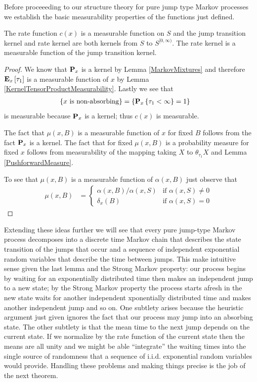 Before proceeeding to our structure theory for pure jump type Markov
processes we establish the basic measurability properties of the
functions just defined.
\begin{lem}\label{MeasurabilityRateKernel}The rate function $c(x)$ is a measurable function on $S$
  and the jump transition kernel and rate kernel are both kernels from
  $S$ to $S^{[0,\infty)}$.  The rate kernel is a measurable function
  of the jump transition kernel.
\end{lem}
\begin{proof}
We know that $\probabilityop_x$ is a kernel by Lemma
\ref{MarkovMixtures} and therefore $\sexpectation{\tau_1}{x}$ is a
measurable function of $x$ by Lemma
\ref{KernelTensorProductMeasurability}.  Lastly we see that 
\begin{align*}
\lbrace x \text{ is non-absorbing} \rbrace &= \lbrace \sprobability{\tau_1 <
  \infty}{x} = 1 \rbrace
\end{align*}
is measurable because $\probabilityop_x$ is a kernel; thus $c(x)$ is measurable.

The fact that $\mu(x,B)$ is a measurable function of $x$ for fixed $B$
follows from the fact $\probabilityop_x$ is a kernel.  The fact that
for fixed $\mu(x,B)$ is a probability measure for fixed $x$ follows
from measurability of the mapping taking $X$ to $\theta_{\tau_1}X$ and
Lemma \ref{PushforwardMeasure}.

To see that $\mu(x,B)$ is a measurable function of $\alpha(x,B)$ just
observe that 
\begin{align*}
\mu(x,B) &= \begin{cases}
\alpha(x,B)/\alpha(x, S) & \text{if $\alpha(x, S)
  \neq 0$} \\
\delta_x(B) & \text{if $\alpha(x, S) = 0$}
\end{cases}
\end{align*}
\end{proof}

Extending these ideas further we will see that every pure jump-type Markov
process decomposes into a discrete time Markov chain that describes
the state transition of the jumps that occur and a sequence of independent exponential random
variables that describe the time between jumps.   This make intuitive sense given the
last lemma and the Strong Markov property: our process begins by
waiting for an exponentially distributed time then makes an
independent jump to a new state; by the Strong Markov property the
process starts afresh in the new state waits for another independent
xponentially distributed time and makes another independent jump and
so on. 
One subtlety arises because the heuristic argument just given
ignores the fact that our process may jump into an absorbing state.
The other subtlety is that the mean time to the next jump depends on
the current state.  If we normalize by the rate function of the
current state then the means are all unity and we might be able
``integrate'' the waiting times into the single source of randomness
that a sequence of i.i.d. exponential random variables would provide.
Handling these problems and making things precise is the job of the
next theorem.

